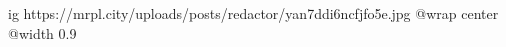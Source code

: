  
 
 
 
 

\ifcmt
  ig https://mrpl.city/uploads/posts/redactor/yan7ddi6ncfjfo5e.jpg
  @wrap center
  @width 0.9
\fi

